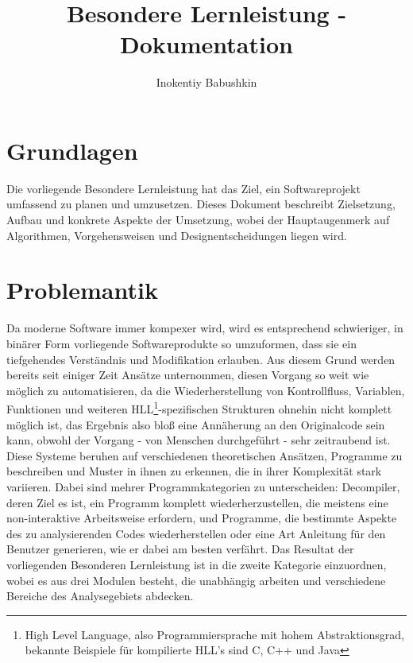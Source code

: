 \documentclass[11pt]{article} %
\title{Besondere Lernleistung - Dokumentation}
\author{Inokentiy Babushkin}
\begin{document}
\maketitle

\begin{multicols}{2}

\section{Grundlagen}
Die vorliegende Besondere Lernleistung hat das Ziel, ein Softwareprojekt umfassend zu planen und umzusetzen. Dieses Dokument beschreibt Zielsetzung, Aufbau und konkrete Aspekte der Umsetzung, wobei der Hauptaugenmerk auf Algorithmen, Vorgehensweisen und Designentscheidungen liegen wird.

\section{Problemantik}
Da moderne Software immer kompexer wird, wird es entsprechend schwieriger, in binärer Form vorliegende Softwareprodukte so umzuformen, dass sie ein tiefgehendes Verständnis und Modifikation erlauben. Aus diesem Grund werden bereits seit einiger Zeit Ansätze unternommen, diesen Vorgang so weit wie möglich zu automatisieren, da die Wiederherstellung von Kontrollfluss, Variablen, Funktionen und weiteren HLL\footnote{High Level Language, also Programmiersprache mit hohem Abstraktionsgrad, bekannte Beispiele für kompilierte HLL's sind C, C++ und Java}-spezifischen Strukturen ohnehin nicht komplett möglich ist, das Ergebnis also bloß eine Annäherung an den Originalcode sein kann, obwohl der Vorgang - von Menschen durchgeführt - sehr zeitraubend ist. Diese Systeme beruhen auf verschiedenen theoretischen Ansätzen, Programme zu beschreiben und Muster in ihnen zu erkennen, die in ihrer Komplexität stark variieren.
Dabei sind mehrer Programmkategorien zu unterscheiden: Decompiler, deren Ziel es ist, ein Programm komplett wiederherzustellen, die meistens eine non-interaktive Arbeitsweise erfordern, und Programme, die bestimmte Aspekte des zu analysierenden Codes wiederherstellen oder eine Art Anleitung für den Benutzer generieren, wie er dabei am besten verfährt. Das Resultat der vorliegenden Besonderen Lernleistung ist in die zweite Kategorie einzuordnen, wobei es aus drei Modulen besteht, die unabhängig arbeiten und verschiedene Bereiche des Analysegebiets abdecken.


\end{multicols}
\end{document}
